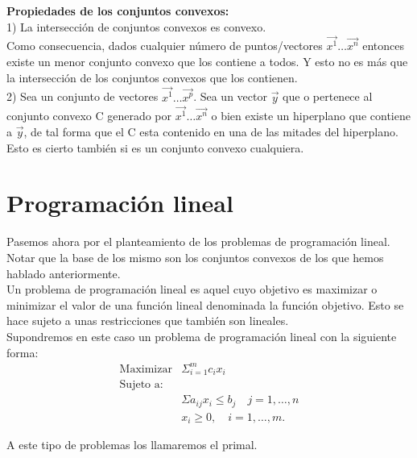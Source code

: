 \documentclass[10pt,a4paper]{book}
\begin{document}
\textbf{Propiedades de los conjuntos convexos:}\\
1) La intersección de conjuntos convexos es convexo.\\
Como consecuencia, dados cualquier número de puntos/vectores $\overrightarrow{x^{1}} \ldots \overrightarrow{x^{n}}$ entonces existe un menor conjunto convexo que los contiene a todos. Y esto no es más que la intersección de los conjuntos convexos que los contienen.\\

2) Sea un conjunto de vectores $\overrightarrow{x^{1}} \ldots \overrightarrow{x^{p}}$. Sea un vector $\overrightarrow{y}$ que o pertenece al conjunto convexo C generado por $\overrightarrow{x^{1}} \ldots \overrightarrow{x^{n}}$ o bien existe un hiperplano que contiene a $\overrightarrow{y}$, de tal forma que el C esta contenido en una de las mitades del hiperplano. \\

Esto es cierto también si es un conjunto convexo cualquiera.\\



\chapter{Programación lineal}

Pasemos ahora por el planteamiento de los problemas de programación lineal. \\
Notar que la base de los mismo son los conjuntos convexos de los que hemos hablado anteriormente.\\

Un problema de programación lineal es aquel cuyo objetivo es maximizar o minimizar el valor de una función lineal denominada la función objetivo. Esto se hace sujeto a unas restricciones que también son lineales.\\

Supondremos en este caso un problema de programación lineal con la siguiente forma:\\


$$\begin{array}{lc}
\mbox{Maximizar} & \Sigma^m_{i=1} c_ix_i \\
\mbox{Sujeto a:}  \\
&  \Sigma a_{ij}x_i \leq b_j \quad j=1,\ldots, n\\
&x_i \geq 0, \quad  i=1, \ldots ,m.
\end{array}$$

A este tipo de problemas los llamaremos el primal.\\
\end{document}

